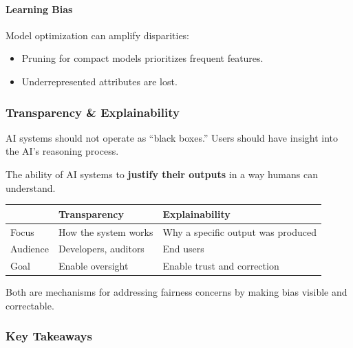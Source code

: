 \paragraph*{Learning Bias}
Model optimization can amplify disparities:
\begin{itemize}
  \item Pruning for compact models prioritizes frequent features.
  \item Underrepresented attributes are lost.
\end{itemize}

\subsubsection*{Transparency \& Explainability}

\begin{defbox}[Transparency]
AI systems should not operate as ``black boxes.'' Users should have insight into the AI's reasoning process.
\end{defbox}

\begin{defbox}[Explainability]
The ability of AI systems to \textbf{justify their outputs} in a way humans can understand.
\end{defbox}

\begin{center}
\renewcommand{\arraystretch}{1.3}
\begin{tabular}{@{} l p{5.5cm} p{5.5cm} @{}}
\toprule
& \textbf{Transparency} & \textbf{Explainability} \\
\midrule
Focus & How the system works & Why a specific output was produced \\
Audience & Developers, auditors & End users \\
Goal & Enable oversight & Enable trust and correction \\
\bottomrule
\end{tabular}
\end{center}

Both are mechanisms for addressing fairness concerns by making bias visible and correctable.

\subsubsection*{Key Takeaways}

